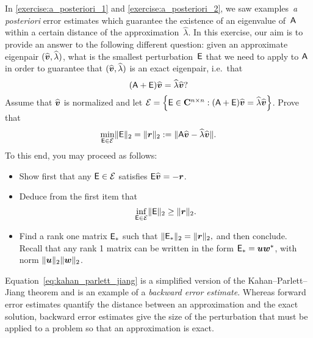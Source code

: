 \begin{exercise}
    In \cref{exercise:a_posteriori_1} and \cref{exercise:a_posteriori_2},
    we saw examples~\emph{a posteriori} error estimates
    which guarantee the existence of an eigenvalue of~$\mathsf A$ within a certain distance of the approximation~$\widehat \lambda$.
    In this exercise,
    our aim is to provide an answer to the following different question:
    given an approximate eigenpair $(\widehat {\mathbf{\boldsymbol{v}}}, \widehat \lambda)$,
    what is the smallest perturbation~$\mathsf E$ that we need to apply to $\mathsf A$ in order to guarantee that
    $(\widehat {\mathbf{\boldsymbol{v}}}, \widehat \lambda)$ is an exact eigenpair, i.e.\ that
    \[
        (\mathsf A + \mathsf E) \widehat {\mathbf{\boldsymbol{v}}} = \widehat \lambda \widehat {\mathbf{\boldsymbol{v}}}?
    \]
    Assume that $\widehat {\mathbf{\boldsymbol{v}}}$ is normalized and
    let $\mathcal E = \Bigl\{\mathsf E \in \mathbf C^{n \times n}: (\mathsf A + \mathsf E) \widehat {\mathbf{\boldsymbol{v}}} = \widehat \lambda \widehat {\mathbf{\boldsymbol{v}}} \Bigr\}$.
    Prove that
    \begin{equation}
        \label{eq:kahan_parlett_jiang}
        \min_{\mathsf E \in \mathcal E} \lVert\mathsf E\rVert_2 = \lVert\mathbf{\boldsymbol{r}}\rVert_2 := \lVert\mathsf A \widehat {\mathbf{\boldsymbol{v}}} - \widehat \lambda \widehat {\mathbf{\boldsymbol{v}}}\rVert.
    \end{equation}
    To this end,
    you may proceed as follows:
    \begin{itemize}
        \item
            Show first that any $\mathsf E \in \mathcal E$ satisfies $\mathsf E \widehat {\mathbf{\boldsymbol{v}}} = - \mathbf{\boldsymbol{r}}$.

        \item
            Deduce from the first item that
            \[
                \inf_{\mathsf E \in \mathcal E} \lVert\mathsf E\rVert_2 \geq \lVert\mathbf{\boldsymbol{r}}\rVert_2.
            \]

        \item
            Find a rank one matrix $\mathsf E_*$ such that
            \(
                \lVert\mathsf E_*\rVert_2 = \lVert\mathbf{\boldsymbol{r}}\rVert_2,
            \)
            and then conclude.
            Recall that any rank 1 matrix can be written in the form $\mathsf E_* = \mathbf{\boldsymbol{u}} \mathbf{\boldsymbol{w}}^*$,
            with norm $\lVert\mathbf{\boldsymbol{u}}\rVert_2 \lVert\mathbf{\boldsymbol{w}}\rVert_2$.
    \end{itemize}
    Equation~\eqref{eq:kahan_parlett_jiang} is a simplified version of the Kahan--Parlett--Jiang theorem
    and is an example of a \emph{backward error estimate}.
    Whereas forward error estimates quantify the distance between an approximation and the exact solution,
    backward error estimates give the size of the perturbation that must be applied to a problem so that an approximation is exact.
\end{exercise}

